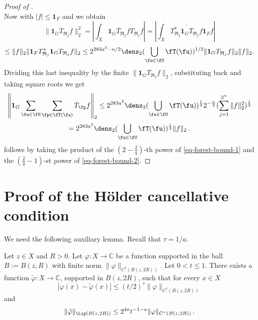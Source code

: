 \begin{proof}[Proof of ]
$$    $$
    Now with $|f| \le \mathbf{1}_F$ and  we obtain
    $$
        \| \mathbf{1}_G T_{\mathfrak{R}_j} f \|_2^2 = \left| \int_X \overline{\mathbf{1}_G T_{\mathfrak{R}_j} f} T_{\mathfrak{R}_j} f \right| = \left| \int_X \overline{T_{\mathfrak{R}_j}^* \mathbf{1}_G T_{\mathfrak{R}_j} f} \mathbf{1}_F f \right|
    $$
    $$
        \le \|f\|_2 \| \mathbf{1}_F T_{\mathfrak{R}_j}^* \mathbf{1}_G T_{\mathfrak{R}_j} f \|_2 \le 2^{283a^3-n/2} \dens_2(\bigcup_{\fu\in \fU}\fT(\fu))^{1/2} \| \mathbf{1}_G T_{\mathfrak{R}_j} f \|_2 \|f\|_2.
    $$
    Dividing this last inequality by the finite $\| \mathbf{1}_G T_{\mathfrak{R}_j} f \|_2$, substituting back and taking square roots we get
    $$
        \left\|\mathbf{1}_G \sum_{\fu \in \fU} \sum_{\fp \in \fT(\fu)} T_{\fp} f\right\|_2 \le 2^{283a^3} \dens_2(\bigcup_{\fu\in \fU}\fT(\fu))^{\frac{1}{2}} 2^{-\frac{n}{2}} (\sum_{j = 1}^{2^n} \|f\|_2^2)^{\frac{1}{2}}
    $$
    \begin{equation}
        \label{eq-forest-bound-2}
        = 2^{283a^3} \dens_2(\bigcup_{\fu\in \fU}\fT(\fu))^{\frac{1}{2}} \|f\|_2\,.
    \end{equation}
     follows by taking the product of the $(2 - \frac{2}{q})$-th power of \eqref{eq-forest-bound-1} and the $(\frac{2}{q} - 1)$-st power of \eqref{eq-forest-bound-2}.
\end{proof}

\section{Proof of the H\"older cancellative condition}
\label{liphoel}

We need the following auxiliary lemma.
Recall that $\tau = 1/a$.

\begin{lemma}
    \label{Lipschitz-Holder-approximation}
    \leanok
    Let $z\in X$ and $R>0$. Let $\varphi: X \to \mathbb{C}$ be a function supported in the ball
    $B:=B(z,R)$ with finite norm $\|\varphi\|_{C^\tau(B(z, 2R))}$.
    Let $0<t \leq 1$. There exists a function $\tilde \varphi : X \to \mathbb{C}$, supported in $B(z,2R)$, such that for every $x\in X$
    \begin{equation}\label{eq-firstt}
        |\varphi(x) - \tilde \varphi(x)| \leq (t/2)^{\tau} \|\varphi\|_{C^\tau(B(z,2R))}
    \end{equation}and
   \begin{equation}\label{eq-secondt}
       \|\tilde \varphi\|_{\Lip(B(z,2R))} \leq 2^{4a}t^{-1-a} \|\varphi\|_{C^{\tau}(B(z,2R))}\, .
   \end{equation}
\end{lemma}


